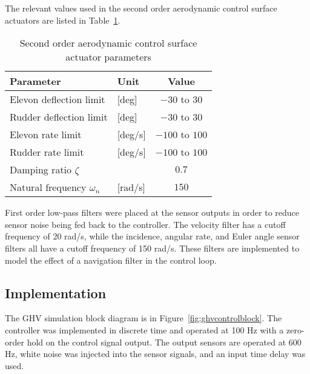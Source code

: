 \documentclass[]{../sty/aiaa-tc}
\begin{document}
  The relevant values used in the second order aerodynamic control surface actuators are listed in Table~\ref{tab:actuator}.
  \begin{table}[H]
    \centering
    \caption{Second order aerodynamic control surface actuator parameters\label{tab:actuator}}
    \begin{tabular}{llc}
      \toprule
      Parameter & Unit & Value \\ \midrule
      Elevon deflection limit & [deg] & $-30$ to $30$ \\
      Rudder deflection limit & [deg] & $-30$ to $30$ \\
      Elevon rate limit & [deg/s] & $-100$ to $100$ \\
      Rudder rate limit & [deg/s] & $-100 $ to $100$ \\
      Damping ratio $\zeta$ & & $0.7$ \\
      Natural frequency $\omega_{n}$ & [rad/s] & $150$ \\
      \bottomrule
    \end{tabular}
  \end{table}
  First order low-pass filters were placed at the sensor outputs in order to reduce sensor noise being fed back to the controller.
  The velocity filter has a cutoff frequency of 20 rad/s, while the incidence, angular rate, and Euler angle sensor filters all have a cutoff frequency of 150 rad/s.
  These filters are implemented to model the effect of a navigation filter in the control loop.

  \subsection{Implementation}

  The GHV simulation block diagram is in Figure~\ref{fig:ghvcontrolblock}.
  The controller was implemented in discrete time and operated at 100 Hz with a zero-order hold on the control signal output.
  The output sensors are operated at 600 Hz, white noise was injected into the sensor signals, and an input time delay was used.
\end{document}
